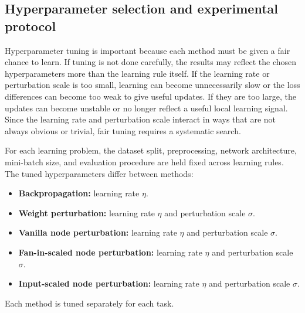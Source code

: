 \subsection{Hyperparameter selection and experimental protocol}

Hyperparameter tuning is important because each method must be given a fair chance to learn. If tuning is not done carefully, the results may reflect the chosen hyperparameters more than the learning rule itself. If the learning rate or perturbation scale is too small, learning can become unnecessarily slow or the loss differences can become too weak to give useful updates. If they are too large, the updates can become unstable or no longer reflect a useful local learning signal. Since the learning rate and perturbation scale interact in ways that are not always obvious or trivial, fair tuning requires a systematic search.

For each learning problem, the dataset split, preprocessing, network architecture, mini-batch size, and evaluation procedure are held fixed across learning rules. The tuned hyperparameters differ between methods:
\begin{itemize}
    \item \textbf{Backpropagation:} learning rate \(\eta\).
    \item \textbf{Weight perturbation:} learning rate \(\eta\) and perturbation scale \(\sigma\).
    \item \textbf{Vanilla node perturbation:} learning rate \(\eta\) and perturbation scale \(\sigma\).
    \item \textbf{Fan-in-scaled node perturbation:} learning rate \(\eta\) and perturbation scale \(\sigma\).
    \item \textbf{Input-scaled node perturbation:} learning rate \(\eta\) and perturbation scale \(\sigma\).
\end{itemize}
Each method is tuned separately for each task.

